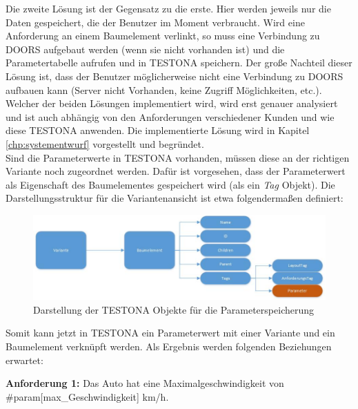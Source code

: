 Die zweite Lösung ist der Gegensatz zu die erste. Hier werden jeweils nur die Daten gespeichert, die der Benutzer im Moment verbraucht. Wird eine Anforderung an einem Baumelement verlinkt, so muss eine Verbindung zu DOORS aufgebaut werden (wenn sie nicht vorhanden ist) und die Parametertabelle aufrufen und in TESTONA speichern. Der große Nachteil dieser Lösung ist, dass der Benutzer möglicherweise nicht eine Verbindung zu DOORS aufbauen kann (Server nicht Vorhanden, keine Zugriff Möglichkeiten, etc.). Welcher der beiden Lösungen implementiert wird, wird erst genauer analysiert und ist auch abhängig von den Anforderungen verschiedener Kunden und wie diese TESTONA anwenden. Die implementierte Lösung wird in Kapitel \ref{chp:systementwurf} vorgestellt und begründet.\\


Sind die Parameterwerte in TESTONA vorhanden, müssen diese an der richtigen Variante noch zugeordnet werden. Dafür ist vorgesehen, dass der Parameterwert als Eigenschaft des Baumelementes gespeichert wird (als ein \textit{Tag} Objekt). Die Darstellungsstruktur für die Variantenansicht ist etwa folgendermaßen definiert:\\

\begin{figure}[h!]
  \begin{center}
    \includegraphics[scale=0.5]{4_1_UML_Var_TreeItem_Properties.jpg}
  		  \caption{Darstellung der TESTONA Objekte für die Parameterspeicherung}
     \label{ttn.objectGraph}
  \end{center}
\end{figure}


Somit kann jetzt in TESTONA ein Parameterwert mit einer Variante und ein Baumelement verknüpft werden. Als Ergebnis werden folgenden Beziehungen erwartet:

\begin{center}
\textbf{Anforderung 1: }Das Auto hat eine Maximalgeschwindigkeit von \#param[max\_Geschwindigkeit] km/h.
\end{center}


